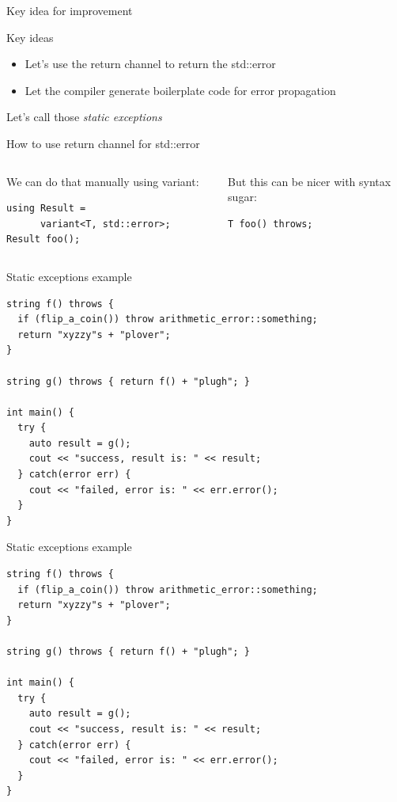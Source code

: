 \documentclass[10pt]{beamer}
\begin{document}
\begin{frame}{Key idea for improvement}
	\begin{block}{Key ideas}
		\begin{itemize}[<+- | alert@+>]
			\item Let's use the return channel to return the std::error
			\item Let the compiler generate boilerplate code for error propagation
		\end{itemize}
	\end{block}
	Let's call those \emph{\color{amethyst}static exceptions}
\end{frame}
	
\begin{frame}[fragile]{How to use return channel for std::error}
	\begin{columns}[T]
		\begin{column}{0.48\linewidth}
			We can do that manually using variant:
			\begin{verbatim}
using Result = 
      variant<T, std::error>;			
Result foo();
			\end{verbatim}
		\end{column}
		\begin{column}{0.48\linewidth}
			But this can be nicer with syntax sugar:
			\begin{verbatim}
T foo() throws;
			\end{verbatim}
		\end{column}
	\end{columns}
\end{frame}

\begin{frame}[fragile]{Static exceptions example}
	
	\begin{verbatim}
string f() throws {
  if (flip_a_coin()) throw arithmetic_error::something;
  return "xyzzy"s + "plover"; 
}

string g() throws { return f() + "plugh"; } 

int main() {
  try {
    auto result = g();
    cout << "success, result is: " << result;
  } catch(error err) {
    cout << "failed, error is: " << err.error();
  }
}
	\end{verbatim}
\end{frame}

\begin{frame}[fragile]{Static exceptions example}
	
	\begin{verbatim}
string f() throws {
  if (flip_a_coin()) throw arithmetic_error::something;
  return "xyzzy"s + "plover"; 
}

string g() throws { return f() + "plugh"; } 

int main() {
  try {
    auto result = g();
    cout << "success, result is: " << result;
  } catch(error err) {
    cout << "failed, error is: " << err.error();
  }
}
	\end{verbatim}
\end{frame}
\end{document}
